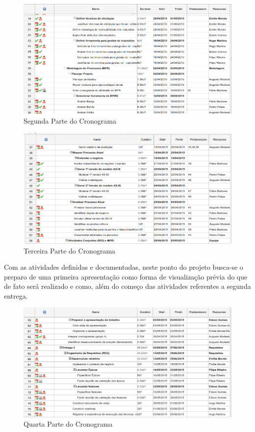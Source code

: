 \begin{figure}[!htb]
\centering
\includegraphics[scale=0.55]{figuras/cronograma2.png}
\caption{Segunda Parte do Cronograma}
\end{figure}

\begin{figure}[!htb]
\centering
\includegraphics[scale=0.55]{figuras/cronograma3.png}
\caption{Terceira Parte do Cronograma}
\end{figure}

Com as atividades definidas e documentadas, neste ponto do projeto busca-se o preparo de uma primeira apresentação como forma de visualização prévia do que de fato será realizado e como, além do começo das atividades referentes a segunda entrega.

\begin{figure}[!htb]
\centering
\includegraphics[scale=0.55]{figuras/cronograma4.png}
\caption{Quarta Parte do Cronograma}
\end{figure}

